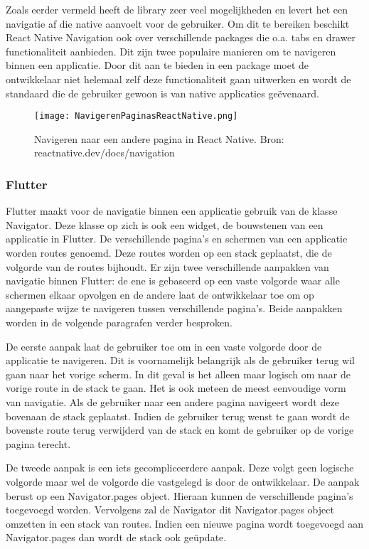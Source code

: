 Zoals eerder vermeld heeft de library zeer veel mogelijkheden en levert het een navigatie af die native aanvoelt voor de gebruiker. Om dit te bereiken beschikt React Native Navigation ook over verschillende packages die o.a. tabs en drawer functionaliteit aanbieden. Dit zijn twee populaire manieren om te navigeren binnen een applicatie. Door dit aan te bieden in een package moet de ontwikkelaar niet helemaal zelf deze functionaliteit gaan uitwerken en wordt de standaard die de gebruiker gewoon is van native applicaties geëvenaard.

\begin{figure}
    \texttt{[image: NavigerenPaginasReactNative.png]}
    \caption{Navigeren naar een andere pagina in React Native. Bron: reactnative.dev/docs/navigation}
    \label{fig:navigerenReactNative}
\end{figure}

\subsubsection{Flutter}
\label{subsubsec:navigatieFlutter}

Flutter maakt voor de navigatie binnen een applicatie gebruik van de klasse Navigator. Deze klasse op zich is ook een widget, de bouwstenen van een applicatie in Flutter. De verschillende pagina's en schermen van een applicatie worden routes genoemd. Deze routes worden op een stack geplaatst, die de volgorde van de routes bijhoudt. Er zijn twee verschillende aanpakken van navigatie binnen Flutter: de ene is gebaseerd op een vaste volgorde waar alle schermen elkaar opvolgen en de andere laat de ontwikkelaar toe om op aangepaste wijze te navigeren tussen verschillende pagina's. Beide aanpakken worden in de volgende paragrafen verder besproken. 

De eerste aanpak laat de gebruiker toe om in een vaste volgorde door de applicatie te navigeren. Dit is voornamelijk belangrijk als de gebruiker terug wil gaan naar het vorige scherm. In dit geval is het alleen maar logisch om naar de vorige route in de stack te gaan. Het is ook meteen de meest eenvoudige vorm van navigatie. Als de gebruiker naar een andere pagina navigeert wordt deze bovenaan de stack geplaatst. Indien de gebruiker terug wenst te gaan wordt de bovenste route terug verwijderd van de stack en komt de gebruiker op de vorige pagina terecht.

De tweede aanpak is een iets gecompliceerdere aanpak. Deze volgt geen logische volgorde maar wel de volgorde die vastgelegd is door de ontwikkelaar. De aanpak berust op een Navigator.pages object. Hieraan kunnen de verschillende pagina's toegevoegd worden. Vervolgens zal de Navigator dit Navigator.pages object omzetten in een stack van routes. Indien een nieuwe pagina wordt toegevoegd aan Navigator.pages dan wordt de stack ook geüpdate. 


